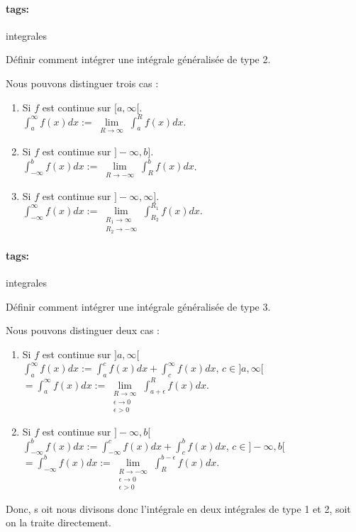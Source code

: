 \documentclass[12pt]{article}
\newcommand*{\xfield}[1]{\begin{mdframed}\centering #1\end{mdframed}\bigskip}
\newenvironment{note}{}{}
\newcommand*{\tags}[1]{\paragraph{tags: }#1}
\begin{document}
\begin{note}
	\tags{integrales}
	\xfield{Définir comment intégrer une intégrale généralisée de type 2.}
	\xfield{Nous pouvons distinguer trois cas :\begin{enumerate}
		\item Si $f$ est continue sur $[a,\infty[$.\\
		$\int_{a}^{\infty} f(x)dx := \lim\limits_{\substack{R \to \infty}} \int_{a}^{R}f(x)dx$.
		\item Si $f$ est continue sur $]-\infty,b]$.\\
		$\int_{-\infty}^{b} f(x)dx := \lim\limits_{\substack{R \to -\infty}} \int_{R}^{b}f(x)dx$.
		\item Si $f$ est continue sur $]-\infty,\infty]$.\\
		$\int_{-\infty}^{\infty} f(x)dx := \lim\limits_{\substack{R_1 \to \infty \\ R_2 \to -\infty}} \int_{R_2}^{R_1}f(x)dx$.
	\end{enumerate} }
\end{note}

\begin{note}
	\tags{integrales}
	\xfield{Définir comment intégrer une intégrale généralisée de type 3.}
	\xfield{Nous pouvons distinguer deux cas :\begin{enumerate}
		\item Si $f$ est continue sur $]a,\infty[$ \\
			$\int_{a}^{\infty} f(x)dx := \int_{a}^{c} f(x)dx + \int_{c}^{\infty}f(x)dx$, $c \in ]a,\infty[$\\
			$= \int_{a}^{\infty} f(x)dx := \lim\limits_{\substack{R \to \infty \\ \epsilon \to 0 \\ \epsilon > 0}} \int_{a+\epsilon}^{R}f(x)dx$.\\
		\item Si $f$ est continue sur $]-\infty,b[$ \\
			$\int_{-\infty}^{b} f(x)dx := \int_{-\infty}^{c} f(x)dx + \int_{c}^{b}f(x)dx$, $c \in ]-\infty,b[$\\
			$= \int_{-\infty}^{b} f(x)dx := \lim\limits_{\substack{R \to -\infty \\ \epsilon \to 0 \\ \epsilon > 0}} \int_{R}^{b-\epsilon}f(x)dx$.\\
	\end{enumerate}
	Donc, s oit nous divisons donc l'intégrale en deux intégrales de type 1 et 2, soit on la traite directement.}
\end{note}
\end{document}
